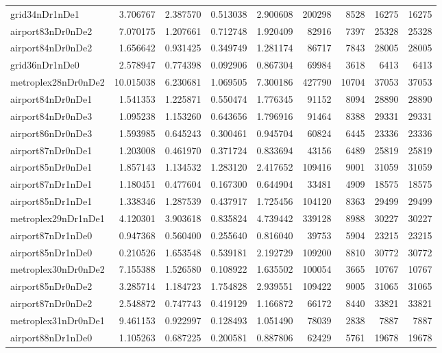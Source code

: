 \begin{longtable}{|l|r|r|r|r|r|r|r|r|}
grid34nDr1nDe1 & 3.706767 & 2.387570 & 0.513038 & 2.900608 & 200298 & 8528 & 16275 & 16275 \\
airport83nDr0nDe2 & 7.070175 & 1.207661 & 0.712748 & 1.920409 & 82916 & 7397 & 25328 & 25328 \\
airport84nDr0nDe2 & 1.656642 & 0.931425 & 0.349749 & 1.281174 & 86717 & 7843 & 28005 & 28005 \\
grid36nDr1nDe0 & 2.578947 & 0.774398 & 0.092906 & 0.867304 & 69984 & 3618 & 6413 & 6413 \\
metroplex28nDr0nDe2 & 10.015038 & 6.230681 & 1.069505 & 7.300186 & 427790 & 10704 & 37053 & 37053 \\
airport84nDr0nDe1 & 1.541353 & 1.225871 & 0.550474 & 1.776345 & 91152 & 8094 & 28890 & 28890 \\
airport84nDr0nDe3 & 1.095238 & 1.153260 & 0.643656 & 1.796916 & 91464 & 8388 & 29331 & 29331 \\
airport86nDr0nDe3 & 1.593985 & 0.645243 & 0.300461 & 0.945704 & 60824 & 6445 & 23336 & 23336 \\
airport87nDr0nDe1 & 1.203008 & 0.461970 & 0.371724 & 0.833694 & 43156 & 6489 & 25819 & 25819 \\
airport85nDr0nDe1 & 1.857143 & 1.134532 & 1.283120 & 2.417652 & 109416 & 9001 & 31059 & 31059 \\
airport87nDr1nDe1 & 1.180451 & 0.477604 & 0.167300 & 0.644904 & 33481 & 4909 & 18575 & 18575 \\
airport85nDr1nDe1 & 1.338346 & 1.287539 & 0.437917 & 1.725456 & 104120 & 8363 & 29499 & 29499 \\
metroplex29nDr1nDe1 & 4.120301 & 3.903618 & 0.835824 & 4.739442 & 339128 & 8988 & 30227 & 30227 \\
airport87nDr1nDe0 & 0.947368 & 0.560400 & 0.255640 & 0.816040 & 39753 & 5904 & 23215 & 23215 \\
airport85nDr1nDe0 & 0.210526 & 1.653548 & 0.539181 & 2.192729 & 109200 & 8810 & 30772 & 30772 \\
metroplex30nDr0nDe2 & 7.155388 & 1.526580 & 0.108922 & 1.635502 & 100054 & 3665 & 10767 & 10767 \\
airport85nDr0nDe2 & 3.285714 & 1.184723 & 1.754828 & 2.939551 & 109422 & 9005 & 31065 & 31065 \\
airport87nDr0nDe2 & 2.548872 & 0.747743 & 0.419129 & 1.166872 & 66172 & 8440 & 33821 & 33821 \\
metroplex31nDr0nDe1 & 9.461153 & 0.922997 & 0.128493 & 1.051490 & 78039 & 2838 & 7887 & 7887 \\
airport88nDr1nDe0 & 1.105263 & 0.687225 & 0.200581 & 0.887806 & 62429 & 5761 & 19678 & 19678 \\

\end{longtable}
